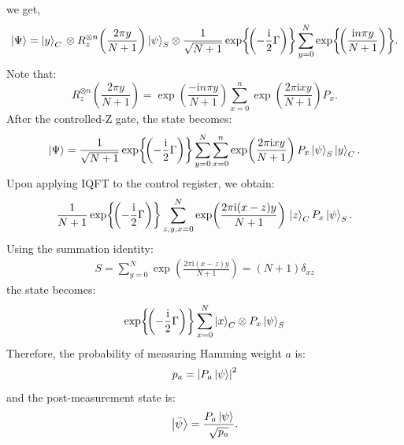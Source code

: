 \documentclass[a4paper, 11pt]{article}
\begin{document}
we get,
\begin{equation}
	\ket{\Psi} = \ket{y}_C \\ \otimes R_z^{\otimes n} \!\left( \frac{2 \pi y}{N+1}\right) \ket{\psi}_S \otimes \frac{1}{\sqrt{N+1}} \exp{\!\left(  - \frac{\mathrm{i}}{2} \Gamma \right)} \sum_{y=0}^N \exp{\!\left( \frac{\mathrm{i}n\pi y}{N+1} \right)} .
\end{equation}
Note that:
\begin{equation}
    R_z^{\otimes n}\!\left(\frac{2 \pi y}{N+1}\right) = \exp\! \left(\frac{-\mathrm{i}n \pi y}{N+1} \right) \sum_{x=0}^n \exp\! \left( \frac{2\pi \mathrm{i} xy}{N+1} \right) P_x.
\end{equation}
After the controlled-Z gate, the state becomes:
\begin{equation}
	\ket{\Psi} = \frac{1}{\sqrt{N+1}} \exp{\!\left(  - \frac{\mathrm{i}}{2} \Gamma \right)} \sum_{y=0}^N \sum_{x=0}^n \exp\! \left( \frac{2\pi \mathrm{i} xy}{N+1} \right) P_x\ket{\psi}_S\ket{y}_C .
\end{equation} 
Upon applying IQFT to the control register, we obtain:
\begin{equation}
	\frac{1}{N+1} \exp{\!\left(  - \frac{\mathrm{i}}{2} \Gamma \right)} \sum_{z,y,x=0}^N  \exp\! \left( \frac{2\pi \mathrm{i} (x-z) y}{N+1} \right) \\ \ket{z}_C P_x \ket{\psi}_S.
\end{equation}
Using the summation identity:
\begin{align}
	S = \sum_{y=0}^N  \exp\! \left( \frac{2\pi \mathrm{i} (x-z) y}{N+1} \right) = (N+1)\delta_{xz}
\end{align}
the state becomes:
\begin{equation}
	\exp{\!\left(  - \frac{\mathrm{i}}{2} \Gamma \right)} \sum_{x=0}^N \ket{x}_C \otimes P_x\ket{\psi}_S
\end{equation}
Therefore, the probability of measuring Hamming weight $a$ is:
\begin{equation}
	p_{a} = \left| P_{a} \ket{\psi} \right|^{2}
	\label{eq:hamming_weight_probability}
\end{equation}
and the post-measurement state is:
\begin{equation}
	\ket{\bar{\psi}}  = \frac{P_{a} \ket{\psi}}{\sqrt{p_{a}}}.
	\label{eq:post_measurement_state}
\end{equation}
\end{document}
